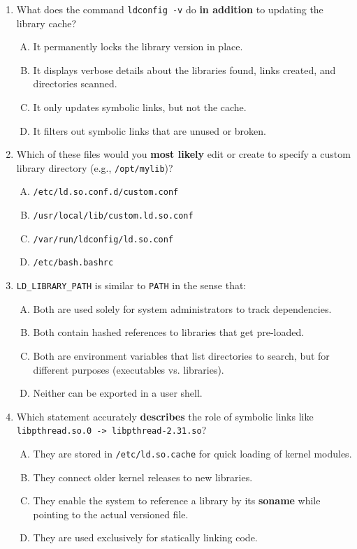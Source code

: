 \documentclass[a4paper]{report}
\begin{document}
\begin{enumerate}[1.]
    \item What does the command \texttt{ldconfig -v} do \textbf{in addition} to updating the library cache?  
    \begin{enumerate}[A)]
        \item It permanently locks the library version in place.  
        \item It displays verbose details about the libraries found, links created, and directories scanned.  
        \item It only updates symbolic links, but not the cache.  
        \item It filters out symbolic links that are unused or broken.  
    \end{enumerate}

    \item Which of these files would you \textbf{most likely} edit or create to specify a custom library directory (e.g., \texttt{/opt/mylib})?  
    \begin{enumerate}[A)]
        \item \texttt{/etc/ld.so.conf.d/custom.conf}  
        \item \texttt{/usr/local/lib/custom.ld.so.conf}  
        \item \texttt{/var/run/ldconfig/ld.so.conf}  
        \item \texttt{/etc/bash.bashrc}  
    \end{enumerate}

    \item \texttt{LD\_LIBRARY\_PATH} is similar to \texttt{PATH} in the sense that:  
    \begin{enumerate}[A)]
        \item Both are used solely for system administrators to track dependencies.  
        \item Both contain hashed references to libraries that get pre-loaded.  
        \item Both are environment variables that list directories to search, but for different purposes (executables vs. libraries).  
        \item Neither can be exported in a user shell.  
    \end{enumerate}

    \item Which statement accurately \textbf{describes} the role of symbolic links like \texttt{libpthread.so.0 -> libpthread-2.31.so}?  
    \begin{enumerate}[A)]
        \item They are stored in \texttt{/etc/ld.so.cache} for quick loading of kernel modules.  
        \item They connect older kernel releases to new libraries.  
        \item They enable the system to reference a library by its \textbf{soname} while pointing to the actual versioned file.  
        \item They are used exclusively for statically linking code.  
    \end{enumerate}

\end{enumerate}
\end{document}
